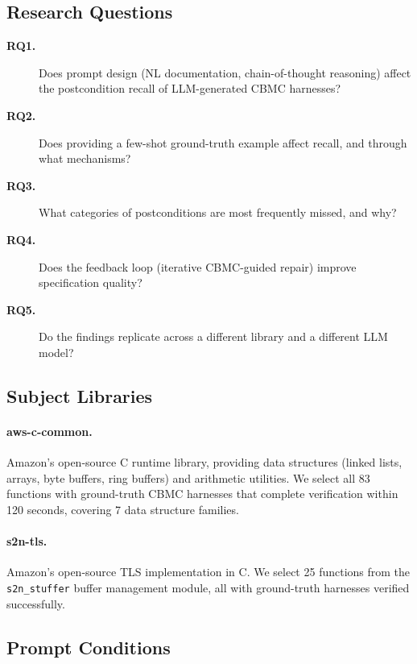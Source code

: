 \documentclass[review]{elsarticle}
\begin{document}
\subsection{Research Questions}

\begin{description}
  \item[\textbf{RQ1.}] Does prompt design (NL documentation, chain-of-thought
    reasoning) affect the postcondition recall of LLM-generated CBMC harnesses?

  \item[\textbf{RQ2.}] Does providing a few-shot ground-truth example affect
    recall, and through what mechanisms?

  \item[\textbf{RQ3.}] What categories of postconditions are most frequently
    missed, and why?

  \item[\textbf{RQ4.}] Does the feedback loop (iterative CBMC-guided repair)
    improve specification quality?

  \item[\textbf{RQ5.}] Do the findings replicate across a different library
    and a different LLM model?
\end{description}

\subsection{Subject Libraries}

\paragraph{aws-c-common.} Amazon's open-source C runtime library, providing
data structures (linked lists, arrays, byte buffers, ring buffers) and arithmetic
utilities. We select all 83 functions with ground-truth CBMC harnesses that
complete verification within 120 seconds, covering 7 data structure families.

\paragraph{s2n-tls.} Amazon's open-source TLS implementation in C. We select
25 functions from the \texttt{s2n\_stuffer} buffer management module, all with
ground-truth harnesses verified successfully.

\subsection{Prompt Conditions}
\end{document}
